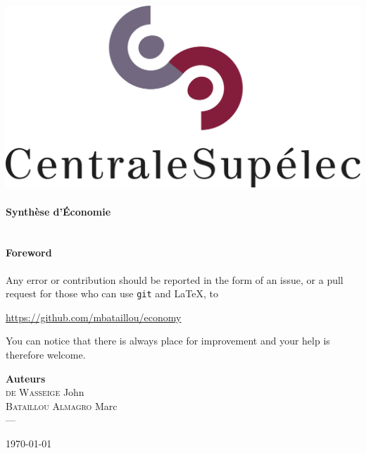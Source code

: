 \begin{titlepage}
\begin{center}


\includegraphics[scale=0.5]{./img/logo_centralesup.jpg} \\[1.5cm]



\vfill
\HRule \\[0.4cm]
{ \huge \bfseries Synthèse d'Économie \\[0.4cm] }
\HRule \\[1.5cm]

\vfill
\paragraph{Foreword}
Any error or contribution should be reported
in the form of an issue, or a pull request for those
who can use \texttt{git} and \LaTeX, to
\begin{center}
  \url{https://github.com/mbataillou/economy}
\end{center}
You can notice that there is always place for improvement
and your help is therefore welcome.
\vspace{\baselineskip}

\vfill
{\large
\begin{center}
  {\Large  \hspace{0.5cm} \textbf{Auteurs} \hspace{0.5cm}   } \\[0.3cm]
	\textsc{de Wasseige} John  \\
	\textsc{Bataillou Almagro} Marc \\
	  ---
\end{center}
}
\vfill

{\large \today}

\end{center}
\end{titlepage}